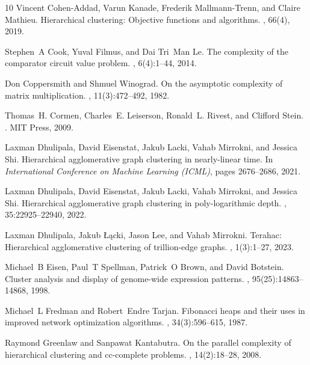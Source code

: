 \documentclass[11pt]{article}
\begin{document}
\begin{thebibliography}{10}
Vincent Cohen-Addad, Varun Kanade, Frederik {Mallmann-Trenn}, and Claire Mathieu.
\newblock Hierarchical clustering: Objective functions and algorithms.
, 66(4), 2019.

Stephen~A Cook, Yuval Filmus, and Dai Tri~Man Le.
\newblock The complexity of the comparator circuit value problem.
, 6(4):1--44, 2014.

Don Coppersmith and Shmuel Winograd.
\newblock On the asymptotic complexity of matrix multiplication.
, 11(3):472--492, 1982.

Thomas~H. Cormen, Charles~E. Leiserson, Ronald~L. Rivest, and Clifford Stein.
.
\newblock MIT Press, 2009.

Laxman Dhulipala, David Eisenstat, Jakub Lacki, Vahab Mirrokni, and Jessica Shi.
\newblock Hierarchical agglomerative graph clustering in nearly-linear time.
\newblock In {\em International Conference on Machine Learning (ICML)}, pages 2676--2686, 2021.

Laxman Dhulipala, David Eisenstat, Jakub Lacki, Vahab Mirrokni, and Jessica Shi.
\newblock Hierarchical agglomerative graph clustering in poly-logarithmic depth.
, 35:22925--22940, 2022.

Laxman Dhulipala, Jakub {\L}{\k{a}}cki, Jason Lee, and Vahab Mirrokni.
\newblock Terahac: Hierarchical agglomerative clustering of trillion-edge graphs.
, 1(3):1--27, 2023.

Michael~B Eisen, Paul~T Spellman, Patrick~O Brown, and David Botstein.
\newblock Cluster analysis and display of genome-wide expression patterns.
, 95(25):14863--14868, 1998.

Michael~L Fredman and Robert~Endre Tarjan.
\newblock Fibonacci heaps and their uses in improved network optimization algorithms.
, 34(3):596--615, 1987.

Raymond Greenlaw and Sanpawat Kantabutra.
\newblock On the parallel complexity of hierarchical clustering and cc-complete problems.
, 14(2):18--28, 2008.


\end{thebibliography}
\end{document}
